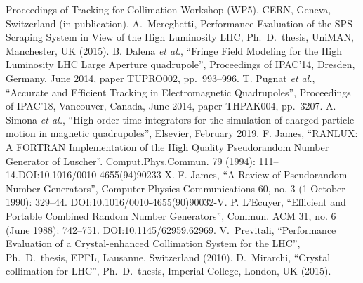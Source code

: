 \begin{thebibliography}{99}
        Proceedings of Tracking for Collimation Workshop (WP5), CERN, Geneva,
        Switzerland (in publication).
        A.~Mereghetti, Performance Evaluation of the SPS Scraping System
        in View of the High Luminosity LHC, Ph.~D.~thesis, UniMAN, Manchester,
        UK (2015).
        B. Dalena \emph{et al.}, ``Fringe Field Modeling for the High Luminosity LHC Large Aperture quadrupole'',
        Proceedings of IPAC’14, Dresden, Germany, June 2014, paper TUPRO002, pp.~993--996.
        T. Pugnat \emph{et al.}, ``Accurate and Efficient Tracking in Electromagnetic Quadrupoles'',
        Proceedings of IPAC’18, Vancouver, Canada, June 2014, paper THPAK004, pp.~3207.
        A. Simona \emph{et al.}, ``High order time integrators for the simulation of charged particle motion in magnetic quadrupoles'',
        Elsevier, February 2019.
        F. James, ``RANLUX: A FORTRAN Implementation of the High Quality Pseudorandom Number Generator of Luscher''.
        Comput.Phys.Commun. 79 (1994): 111–14.DOI:10.1016/0010-4655(94)90233-X.
        F. James, ``A Review of Pseudorandom Number Generators'',
        Computer Physics Communications 60, no. 3 (1 October 1990): 329–44. DOI:10.1016/0010-4655(90)90032-V.
        P. L’Ecuyer, ``Efficient and Portable Combined Random Number Generators'',
        Commun. ACM 31, no. 6 (June 1988): 742–751. DOI:10.1145/62959.62969.
    V.~Previtali, ``Performance Evaluation of a Crystal-enhanced Collimation System for the LHC'',
    Ph.~D.~thesis, EPFL, Lausanne, Switzerland (2010).
    D.~Mirarchi, ``Crystal collimation for LHC'',
    Ph.~D.~thesis, Imperial College, London, UK (2015).
\end{thebibliography}
